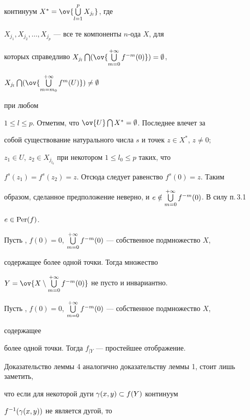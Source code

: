\begin{pf}
континуум $X^*=\ov{\bigcup \limits_{l=1}^{p}X_{j_l}}$, где


$X_{j_1},X_{j_2},\dotsc,X_{j_p}$ --- все те компоненты $n$-ода $X$, для


которых справедливо $X_{j_l}\bigcap (\ov{\ty})=\emptyset$,


$X_{j_l}\bigcap(\ov{\bigcup \limits_{m=m_0}^{+\infty}f^m(U)})\ne \emptyset $


при любом


$1\le l\le p$. Отметим, что $\ov{U}\bigcap X^*= \emptyset$. Последнее влечет за


собой существование натурального числа $s$ и точек $z\in X^*$, $z\ne 0$;


$z_1\in U$, $z_2\in X_{j_{l_0}}$ при некотором $1\le l_0\le p$ таких, что


$f^s(z_1)=f^s(z_2)=z$. Отсюда следует равенство $f^s(0)=z$. Таким


образом, сделанное предположение неверно, и $e\notin \bigcup\limits_{m=0}^{+\infty}f^{-m}(0)$. В силу п.\,3.1


$e\in\operatorname{Per}(f)$.


\end{pf}





\begin{cor} Пусть \fm{}, $f(0)=0$, $\bigcup\limits_{m=0}^{+\infty}f^{-m}(0)$ --- собственное подмножество $X$,


содержащее более одной точки. Тогда множество


$Y=\ov{X\setminus \ty}$ не пусто и инвариантно.


\end{cor}





\begin{lem} Пусть \fm{}, $f(0)=0$, $\bigcup\limits_{m=0}^{+\infty}f^{-m}(0)$ --- собственное подмножество $X$,


содержащее


более одной точки. Тогда $f_{\mid Y}$ --- простейшее отображение.


\end{lem}





Доказательство леммы 4 аналогично доказательству леммы 1, стоит лишь заметить,


что если для некоторой дуги $\gamma (x,y)\subset f(Y)$ континуум


$f^{-1}(\gamma(x,y))$ не является дугой, то


